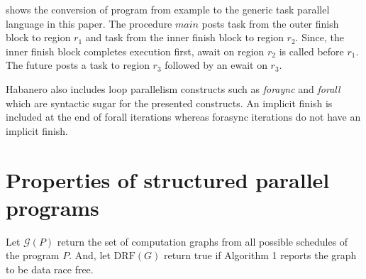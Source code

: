  shows the conversion of program from example  to the generic task parallel language in this paper. The procedure $main$ posts task from the outer finish block to region $r_1$ and task from the inner finish block to region $r_2$. Since, the inner finish block completes execution first, await on region $r_2$ is called before $r_1$. The future posts a task to region $r_3$ followed by an ewait on $r_3$.

Habanero also includes loop parallelism constructs such as \emph{foraync} and \emph{forall} which are syntactic sugar for the presented constructs. An implicit finish is included at the end of forall iterations whereas forasync iterations do not have an implicit finish.

\section{Properties of structured parallel programs}

Let $\mathcal{G}( P )$ return the set of computation graphs from all possible schedules of the program $P$. And, let $\mathrm{DRF}( G )$ return true if Algorithm 1 reports the graph to be data race free.

